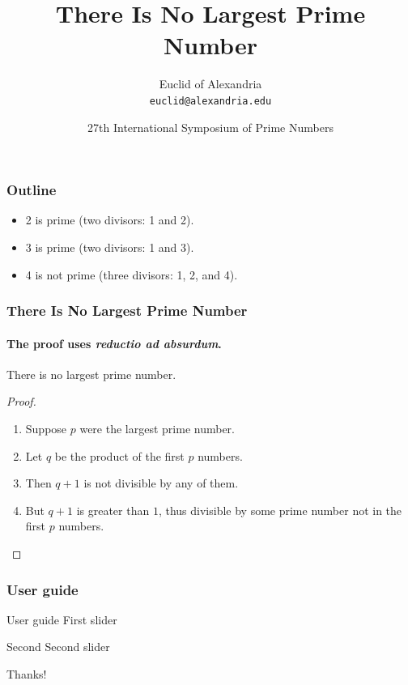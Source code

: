 \documentclass{beamer}
\title{ \title{There Is No Largest Prime Number}}
\date[ISPN ’80]{27th International Symposium of Prime Numbers}
\author[Euclid]{Euclid of Alexandria \\ \texttt{euclid@alexandria.edu}}
\begin{document}
\begin{frame}
\titlepage
\end{frame}


\begin{frame}
\frametitle{Outline}
\tableofcontents[pausesections]
\end{frame}

\begin{itemize}
\item 2 is prime (two divisors: 1 and 2).
\pause
\item 3 is prime (two divisors: 1 and 3).
\pause
\item 4 is not prime (\alert{three} divisors: 1, 2, and 4).
\end{itemize}



\begin{frame}
\frametitle{There Is No Largest Prime Number}
\framesubtitle{The proof uses \textit{reductio ad absurdum}.}
\begin{theorem}
There is no largest prime number.
\end{theorem}
\begin{proof}
\begin{enumerate}
\item<1-| alert@1> Suppose $p$ were the largest prime number.
\item<2-> Let $q$ be the product of the first $p$ numbers.
\item<3-> Then $q+1$ is not divisible by any of them.
\item<1-> But $q + 1$ is greater than $1$, thus divisible by some prime
number not in the first $p$ numbers.\qedhere
\end{enumerate}
\end{proof}
\end{frame}

\begin{frame}
\frametitle{User guide}

\begin{block}{User guide}
First slider
\end{block}


\end{frame}


\begin{frame}
  \begin{block}{Second}
Second slider
    \end{block}
  \end{frame}


\begin{frame}
Thanks!
\end{frame}
\end{document}
